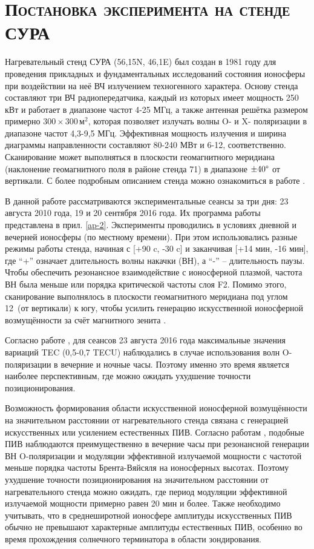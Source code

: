 \section{\textsc{Постановка эксперимента на стенде СУРА}}

Нагревательный стенд СУРА (56,15\degree N, 46,1\degree E) был создан в 1981 году для проведения прикладных и фундаментальных исследований состояния ионосферы при воздействии на неё ВЧ излучением техногенного характера.  
Основу стенда составляют три ВЧ радиопередатчика, каждый из которых имеет мощность 250 кВт и работает в диапазоне частот 4-25 МГц, а также антенная решётка размером примерно $300\times300\,\text{м}^2$, которая позволяет излучать волны O- и X- поляризации в диапазоне частот 4,3-9,5 МГц. 
Эффективная мощность излучения и ширина диаграммы направленности составляют 80-240 МВт и 6-12\degree, соответственно.  
Сканирование может выполняться в плоскости геомагнитного меридиана (наклонение геомагнитного поля в районе стенда 71\degree) в диапазоне $\pm40\degree$ от вертикали.     
С более подробным описанием стенда можно ознакомиться в работе \cite{Belikovich2007}.

В данной работе рассматриваются экспериментальные сеансы за три дня: 23 августа 2010 года, 19 и 20 сентября 2016 года. 
Их программа работы представлена в прил. \ref{ap-2}.
Эксперименты проводились в условиях дневной и вечерней ионосферы (по местному времени).
При этом использовались разные режимы работы стенда, начиная с [+90 c, -30 c] и заканчивая [+14 мин, -16 мин], где ``+'' означает длительность волны накачки (ВН), а ``-'' -- длительность паузы.  
Чтобы обеспечить резонансное взаимодействие с ионосферной плазмой, частота ВН была меньше или порядка критической частоты слоя F2. 
Помимо этого, сканирование выполнялось в плоскости геомагнитного меридиана под углом 12\degree~(от вертикали) к югу, чтобы усилить генерацию искусственной ионосферной возмущённости за счёт магнитного зенита \cite{Streltsov2018, Tereshchenko2004}.

Согласно работе \cite{Kunitsyn2012}, для сеансов 23 августа 2016 года максимальные значения вариаций TEC (0,5-0,7 TECU) наблюдались в случае использования волн O-поляризации в вечерние и ночные часы.
Поэтому именно это время является наиболее перспективным, где можно ожидать ухудшение точности позиционирования. 

Возможность формирования области искусственной ионосферной возмущённости на значительном расстоянии от нагревательного стенда связана с генерацией искусственных или усилением естественных ПИВ.
Согласно работам \cite{Chernogor2011, Chernogor2013, Kunitsyn2012}, подобные ПИВ наблюдаются преимущественно в вечерние часы при резонансной генерации ВН O-поляризации и модуляции эффективной излучаемой мощности с частотой меньше порядка частоты Брента-Вяйсяля на ионосферных высотах. 
Поэтому ухудшение точности позиционирования на значительном расстоянии от нагревательного стенда можно ожидать, где период модуляции эффективной излучаемой мощности примерно равен 20 мин и более.
Также необходимо учитывать, что в среднеширотной ионосфере амплитуды искусственных ПИВ обычно не превышают характерные амплитуды естественных ПИВ, особенно во время прохождения солнечного терминатора в области зондирования.

